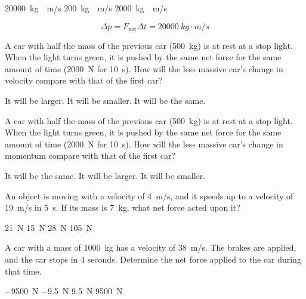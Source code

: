 \documentclass[../main-physics-problems.tex]{subfiles}
\begin{document}
\begin{questions}
\begin{randomizechoices}
    \correctchoice \SI{20000}{kg\cdot m/s}
    \choice \SI{200}{kg\cdot m/s}
    \choice \SI{2000}{kg\cdot m/s}
\end{randomizechoices}

\begin{solution}
\begin{equation*}
    \Delta p = F_\mathrm{net} \Delta t = \boxed{\SI{20000}{kg\cdot m/s}}
\end{equation*}
\end{solution}

\question
A car with half the mass of the previous car (\SI{500}{kg}) is at rest at a stop light.  When the light turns green, it is pushed by the same net force for the same amount of time (\SI{2000}{N} for \SI{10}{s}). How will the less massive car's change in velocity compare with that of the first car? 

\begin{randomizechoices}
    \correctchoice It will be larger.
    \choice It will be smaller. 
    \choice It will be the same.
\end{randomizechoices}

\question
A car with half the mass of the previous car (\SI{500}{kg}) is at rest at a stop light.  When the light turns green, it is pushed by the same net force for the same amount of time (\SI{2000}{N} for \SI{10}{s}). How will the less massive car's change in momentum compare with that of the first car? 

\begin{randomizechoices}
    \correctchoice It will be the same. 
    \choice It will be larger.
    \choice It will be smaller.
\end{randomizechoices}

\question
An object is moving with a velocity of \SI{4}{m/s}, and it speeds up to a velocity of \SI{19}{m/s} in \SI{5}{s}. If its mass is \SI{7}{kg}, what net force acted upon it?

\begin{randomizechoices}
    \correctchoice \SI{21}{N}
    \choice \SI{15}{N}
    \choice \SI{28}{N}
    \choice \SI{105}{N}
\end{randomizechoices}

\question
A car with a mass of \SI{1000}{kg} has a velocity of \SI{38}{m/s}. The brakes are applied, and the car stops in 4 seconds. Determine the net force applied to the car during that time.

\begin{randomizechoices}
    \correctchoice \SI{-9500}{N}
    \choice \SI{-9.5}{N}
    \choice \SI{9.5}{N}
    \choice \SI{9500}{N}
\end{randomizechoices}



\end{questions}
\end{document}
